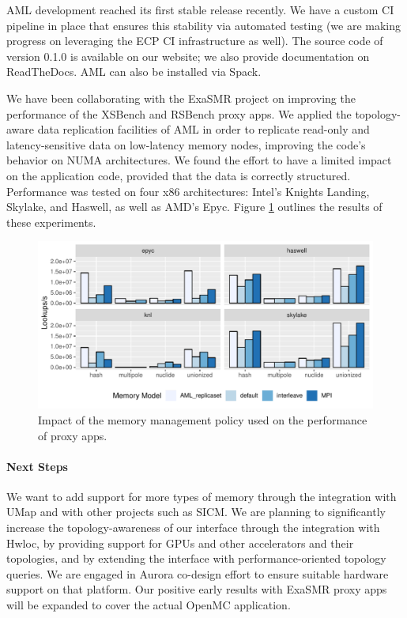 AML development reached its first stable release recently.  We have a custom CI
pipeline in place that ensures this stability via automated testing (we are
making progress on leveraging the ECP CI infrastructure as well).  The
source code of version 0.1.0 is available on our website; we also provide
documentation on ReadTheDocs.  AML can also be installed via Spack.

We have been collaborating with the ExaSMR project on improving the
performance of the XSBench and RSBench proxy apps.  We applied the
topology-aware data replication facilities of AML in order to replicate
read-only and latency-sensitive data on low-latency memory nodes, improving
the code's behavior on NUMA architectures.  We found the effort to have a
limited impact on the application code, provided that the data is correctly
structured.  Performance was tested on four x86 architectures: Intel's
Knights Landing, Skylake, and Haswell, as well as AMD's Epyc.
Figure \ref{fig:argo:aml-results} outlines the results of these
experiments.

\begin{figure}
\centering
\includegraphics[width=.8\textwidth]{projects/2.3.1-PMR/2.3.1.19-Argo-PowerSteering/aml-results}
\caption{Impact of the memory management policy used on the performance of
proxy apps.}
\label{fig:argo:aml-results}
\end{figure}


\paragraph{Next Steps}

We want to add support for more types of memory through the integration
with UMap and with other projects such as SICM.  We are planning to
significantly increase the topology-awareness of our interface through the
integration with Hwloc, by providing support for GPUs and other
accelerators and their topologies, and by extending the interface with
performance-oriented topology queries.  We are engaged in Aurora co-design
effort to ensure suitable hardware support on that platform.  Our
positive early results with ExaSMR proxy apps will be expanded to cover
the actual OpenMC application.

